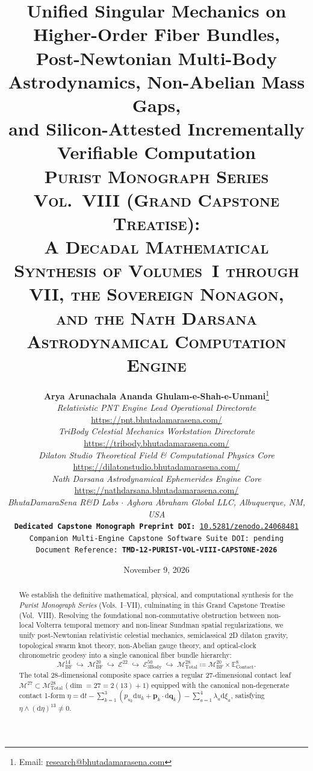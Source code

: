 \documentclass[11pt,a4paper,reqno]{article}
\title{\textbf{\Large Unified Singular Mechanics on Higher-Order Fiber Bundles,\\
Post-Newtonian Multi-Body Astrodynamics, Non-Abelian Mass Gaps,\\
and Silicon-Attested Incrementally Verifiable Computation}\\[1.0ex]
\large \textsc{Purist Monograph Series Vol.~VIII (Grand Capstone Treatise):\\[0.4ex]
A Decadal Mathematical Synthesis of Volumes~I through VII, the Sovereign Nonagon,\\
and the Nath Darsana Astrodynamical Computation Engine}}
\author{
  \textbf{Arya Arunachala Ananda Ghulam-e-Shah-e-Unmani}\thanks{Email: \url{research@bhutadamarasena.com}}\\[1.0ex]
  \textit{Relativistic PNT Engine Lead Operational Directorate}\\
  \url{https://pnt.bhutadamarasena.com/}\\
  \textit{TriBody Celestial Mechanics Workstation Directorate}\\
  \url{https://tribody.bhutadamarasena.com/}\\
  \textit{Dilaton Studio Theoretical Field \& Computational Physics Core}\\
  \url{https://dilatonstudio.bhutadamarasena.com/}\\
  \textit{Nath Darsana Astrodynamical Ephemerides Engine Core}\\
  \url{https://nathdarsana.bhutadamarasena.com/}\\
  \textit{BhutaDamaraSena R\&D Labs $\cdot$ Aghora Abraham Global LLC, Albuquerque, NM, USA}\\[1.2ex]
  \texttt{\textbf{Dedicated Capstone Monograph Preprint DOI:} \href{https://doi.org/10.5281/zenodo.24068481}{10.5281/zenodo.24068481}}\\[0.3ex]
  \texttt{Companion Multi-Engine Capstone Software Suite DOI: pending}\\[0.3ex]
  \texttt{Document Reference: \textbf{TMD-12-PURIST-VOL-VIII-CAPSTONE-2026}}\\[0.3ex]
}
\date{November 9, 2026}
\theoremstyle{plain}
\theoremstyle{definition}
\theoremstyle{remark}
\numberwithin{equation}{section}
\numberwithin{table}{section}
\newcommand{\MbfFourteen}{\mathcal{M}_{\mathrm{BF}}^{14}}
\newcommand{\MbfTwenty}{\mathcal{M}_{\mathrm{BF}}^{20}}
\newcommand{\Econtact}{\mathbb{E}_{\mathrm{Contact}}^8}
\newcommand{\Mtotal}{\mathcal{M}_{\mathrm{Total}}^{28}}
\newcommand{\Mleaf}{\mathcal{M}^{27}}
\newcommand{\Ebundle}{\mathcal{E}^{22}}
\newcommand{\Ebody}{\mathcal{E}^{50}_{\mathrm{3Body}}}
\providecommand{\diff}{\mathrm{d}}
\begin{document}
\maketitle

\clearpage
\begin{abstract}
\noindent
We establish the definitive mathematical, physical, and computational synthesis for the \emph{Purist Monograph Series} (Vols.~I--VII), culminating in this Grand Capstone Treatise (Vol.~VIII). Resolving the foundational non-commutative obstruction between non-local Volterra temporal memory and non-linear Sundman spatial regularizations, we unify post-Newtonian relativistic celestial mechanics, semiclassical 2D dilaton gravity, topological swarm knot theory, non-Abelian gauge theory, and optical-clock chronometric geodesy into a single canonical fiber bundle hierarchy:
\begin{equation*}
  \MbfFourteen \;\hookrightarrow\; \MbfTwenty \;\hookrightarrow\; \Ebundle \;\hookrightarrow\; \Ebody \;\hookrightarrow\; \Mtotal \coloneqq \MbfTwenty \times \Econtact.
\end{equation*}
The total 28-dimensional composite space carries a regular 27-dimensional contact leaf $\Mleaf \subset \Mtotal$ ($\dim = 27 = 2(13) + 1$) equipped with the canonical non-degenerate contact 1-form $\eta = \diff t - \sum_{k=1}^3 (p_{u_k}\diff u_k + \bm{p}_k \cdot \diff\bm{q}_k) - \sum_{a=1}^4 \lambda_a \diff\xi_a$, satisfying $\eta \wedge (\diff\eta)^{13} \ne 0$.


\end{abstract}
\end{document}
